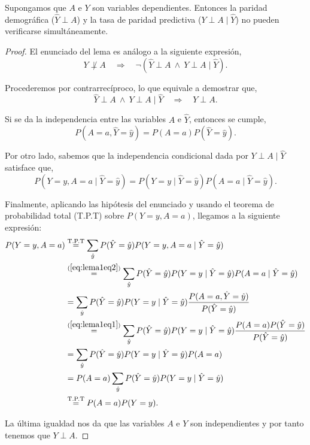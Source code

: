 \documentclass[oneside,openright,titlepage,numbers=noenddot,openany,headinclude,footinclude=true,
cleardoublepage=empty,abstractoff,BCOR=5mm,paper=a4,fontsize=12pt,main=spanish]{scrreprt}
\begin{document}
\clearpage

\begin{lemma} 
Supongamos que $A$ e $Y$ son variables dependientes. Entonces la paridad demográfica ($\hat{Y} \perp A$) y la tasa de paridad predictiva ($Y \perp A \mid \hat{Y}$) no pueden verificarse simultáneamente.
\label{lem:demopred}
\end{lemma}

\begin{proof}
El enunciado del lema es análogo a la siguiente expresión,
\begin{equation*}
Y \not \perp A \quad \Longrightarrow \quad \neg(\hat{Y} \perp A \ \wedge \ Y \perp A \mid \hat{Y}).
\end{equation*}

Procederemos por contrarrecíproco, lo que equivale a demostrar que,
\begin{equation*}
\hat{Y} \perp A \ \wedge \ Y \perp A \mid \hat{Y} \quad \Longrightarrow \quad Y \perp A.
\end{equation*}

Si se da la independencia entre las variables $A$ e $\hat{Y}$, entonces se cumple,
\begin{equation}\label{eq:lema1eq1}
P(A=a,\hat{Y}=\hat{y})=P(A=a)P(\hat{Y}=\hat{y}).
\end{equation}

Por otro lado, sabemos que la independencia condicional dada por $Y \perp A \mid \hat{Y}$ satisface que,
\begin{equation}\label{eq:lema1eq2}
P(Y=y, A=a \mid \hat{Y}=\hat{y})=P(Y=y\mid \hat{Y}=\hat{y})P(A=a\mid \hat{Y}=\hat{y}).
\end{equation}

Finalmente, aplicando las hipótesis del enunciado y usando el teorema de probabilidad total (T.P.T) sobre $P(Y=y,A=a)$, llegamos a la siguiente expresión:
\begin{equation*}
\begin{split}
P(Y=y,A=a)&\overset{\text{T.P.T}}{=}\sum_{\hat{y}} P(\hat{Y}=\hat{y})P(Y=y,A=a \mid \hat{Y}=\hat{y})\\
&\overset{(\ref{eq:lema1eq2})}{=} \sum_{\hat{y}} P(\hat{Y}=\hat{y})P(Y=y\mid \hat{Y}=\hat{y})P(A=a \mid \hat{Y}=\hat{y})\\
&= \sum_{\hat{y}} P(\hat{Y}=\hat{y})P(Y=y\mid \hat{Y}=\hat{y})\frac{\displaystyle P(A=a,\hat{Y}=\hat{y})}{\displaystyle P(\hat{Y}=\hat{y})}\\
&\overset{(\ref{eq:lema1eq1})}{=} \sum_{\hat{y}} P(\hat{Y}=\hat{y})P(Y=y\mid \hat{Y}=\hat{y})\frac{\displaystyle P(A=a)P(\hat{Y}=\hat{y})}{\displaystyle P(\hat{Y}=\hat{y})}\\
&=\sum_{\hat{y}} P(\hat{Y}=\hat{y})P(Y=y\mid \hat{Y}=\hat{y})P(A=a)\\
&=P(A=a)\sum_{\hat{y}} P(\hat{Y}=\hat{y})P(Y=y\mid \hat{Y}=\hat{y})\\
&\overset{\text{T.P.T}}{=}P(A=a)P(Y=y).
\end{split}
\end{equation*}

La última igualdad nos da que las variables $A$ e $Y$ son independientes y por tanto tenemos que $Y\perp A$.
\end{proof}
\end{document}
